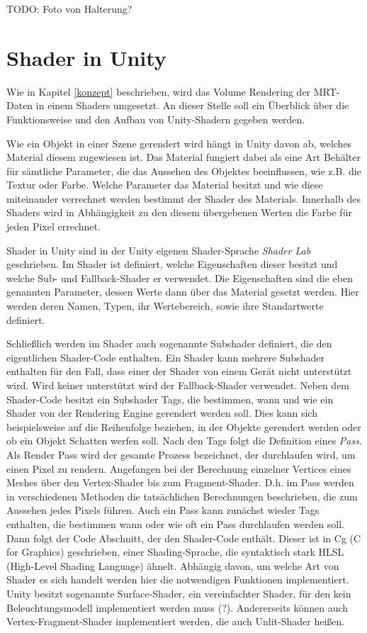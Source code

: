 TODO:
Foto von Halterung?


\section{Shader in Unity}

Wie in Kapitel \ref{konzept} beschrieben, wird das Volume Rendering der MRT-Daten in einem Shaders umgesetzt. An dieser Stelle soll ein Überblick über die Funktionsweise und den Aufbau von Unity-Shadern gegeben werden. 

Wie ein Objekt in einer Szene gerendert wird hängt in Unity davon ab, welches Material diesem zugewiesen ist. Das Material fungiert dabei als eine Art Behälter für sämtliche Parameter, die das Aussehen des Objektes beeinflussen, wie z.B. die Textur oder Farbe. Welche Parameter das Material besitzt und wie diese miteinander verrechnet werden bestimmt der Shader des Materials. Innerhalb des Shaders wird in Abhängigkeit zu den diesem übergebenen Werten die Farbe für jeden Pixel errechnet. 

Shader in Unity sind in der Unity eigenen Shader-Sprache \textit{Shader Lab} geschrieben. Im Shader ist definiert, welche Eigenschaften dieser besitzt und welche Sub- und Fallback-Shader er verwendet.
Die Eigenschaften sind die eben genannten Parameter, dessen Werte dann über das Material gesetzt werden. Hier werden deren Namen, Typen, ihr Wertebereich, sowie ihre Standartwerte definiert. 

Schließlich werden im Shader auch sogenannte Subshader definiert, die den eigentlichen Shader-Code enthalten.
Ein Shader kann mehrere Subshader enthalten für den Fall, dass einer der Shader von einem Gerät nicht unterstützt wird. Wird keiner unterstützt wird der Fallback-Shader verwendet. 
Neben dem Shader-Code besitzt ein Subshader Tags, die bestimmen, wann und wie ein Shader von der Rendering Engine gerendert werden soll. Dies kann sich beispielsweise auf die Reihenfolge beziehen, in der Objekte gerendert werden oder ob ein Objekt Schatten werfen soll. 
Nach den Tags folgt die Definition eines \textit{Pass}. Als Render Pass wird der gesamte Prozess bezeichnet, der durchlaufen wird, um einen Pixel zu rendern. Angefangen bei der Berechnung einzelner Vertices eines Meshes über den Vertex-Shader bis zum Fragment-Shader. D.h. im Pass werden in verschiedenen Methoden die tatsächlichen Berechnungen beschrieben, die zum Aussehen jedes Pixels führen. 
Auch ein Pass kann zunächst wieder Tags enthalten, die bestimmen wann oder wie oft ein Pass durchlaufen werden soll. 
Dann folgt der Code Abschnitt, der den Shader-Code enthält. Dieser ist in Cg (C for Graphics) geschrieben, einer Shading-Sprache, die syntaktisch stark HLSL (High-Level Shading Language) ähnelt. 
Abhängig davon, um welche Art von Shader es sich handelt werden hier die notwendigen Funktionen implementiert. Unity besitzt sogenannte Surface-Shader, ein vereinfachter Shader, für den kein Beleuchtungsmodell implementiert werden muss (?). Andererseits können auch Vertex-Fragment-Shader implementiert werden, die auch Unlit-Shader heißen. 

